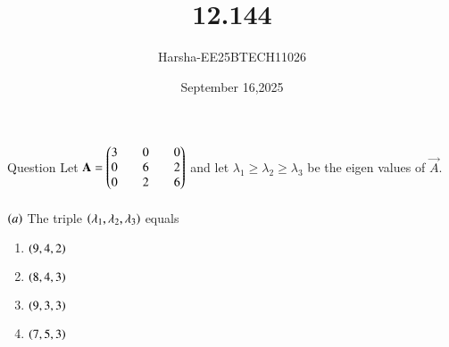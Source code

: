 \documentclass{beamer}
\title %
{12.144}
\date{September 16,2025}
\author %
{Harsha-EE25BTECH11026}
\begin{document}
\frame{\titlepage}


\begin{frame}{Question}
Let $\mathbf{A}=\begin{pmatrix}3&&0&&0\\0&&6&&2\\0&&2&&6\end{pmatrix}$ and let $\lambda_1 \geq \lambda_2 \geq \lambda_3$ be the eigen values of $\vec{A}$.\\
\\
$\left(a\right)$ The triple $\left(\lambda_1,\lambda_2,\lambda_3\right)$ equals
\begin{enumerate}

    \item $\left(9,4,2\right)$
    \item $\left(8,4,3\right)$
    \item $\left(9,3,3\right)$
    \item $\left(7,5,3\right)$
\end{enumerate}
\end{frame}
\end{document}
